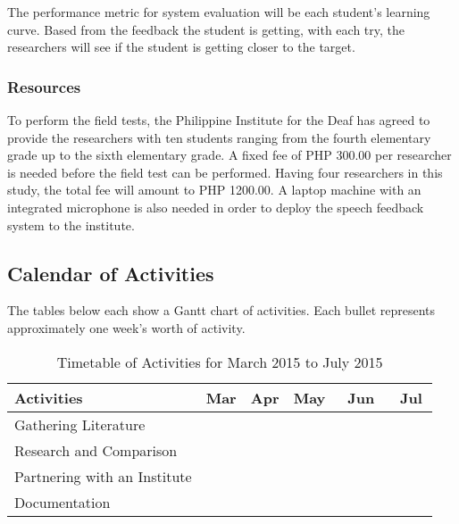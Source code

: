 The performance metric for system evaluation will be each student's learning curve. Based from the feedback the student is getting, with each try, the researchers will see if the student is getting closer to the target.

\subsubsection{Resources}
To perform the field tests, the Philippine Institute for the Deaf has agreed to provide the researchers with ten students ranging from the fourth elementary grade up to the sixth elementary grade. A fixed fee of PHP 300.00 per researcher is needed before the field test can be performed. Having four researchers in this study, the total fee will amount to PHP 1200.00. A laptop machine with an integrated microphone is also needed in order to deploy the speech feedback system to the institute.

\pagebreak
\subsection{Calendar of Activities}

The tables below each show a Gantt chart of activities. Each bullet represents approximately one week's worth of activity.

%
%
\newcommand{\weekone}{\textbullet}
\newcommand{\weektwo}{\textbullet \textbullet}
\newcommand{\weekthree}{\textbullet \textbullet \textbullet}
\newcommand{\weekfour}{\textbullet \textbullet \textbullet \textbullet}

\begin{table}[!htbp]
\centering
\caption{Timetable of Activities for March 2015 to July 2015} \vspace{0.25em}
\begin{tabular}{|p{2in}|c|c|c|c|c|} \hline
\centering Activities			& Mar		& Apr			& May			& Jun		& Jul			\\ \hline
Gathering Literature			& \weekfour	&				&				&~~~~~~		&					\\ \hline
Research and Comparison			&			&\weektwo~~~~	&~\weekthree	&			&				\\ \hline
Partnering with an Institute	&			&				&				&			&~\weekone~~~	\\ \hline
Documentation					& \weekfour	&\weektwo~~~~	&~\weekthree	&			&~\weekone~~~	\\ \hline
\end{tabular}
\label{tab:timetableactivities1}
\end{table}

